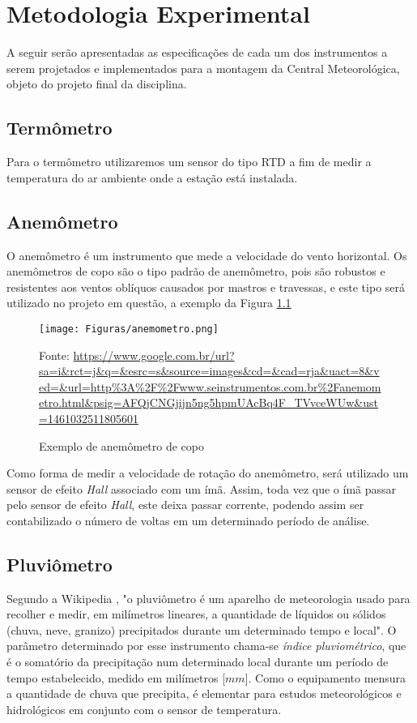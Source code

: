 \documentclass[12pt,a4paper]{instrumentacao}
\begin{document}
\chapter{Metodologia Experimental}
A seguir serão apresentadas as especificações de cada um dos instrumentos a serem projetados e implementados para a montagem da Central Meteorológica, objeto do projeto final da disciplina.

\section{Termômetro}
Para o termômetro utilizaremos um sensor do tipo RTD a fim de medir a temperatura do ar ambiente onde a estação está instalada.

\section{Anemômetro}
O anemômetro é um instrumento que mede a velocidade do vento horizontal. Os anemômetros de copo são o tipo padrão de anemômetro, pois são robustos e resistentes aos ventos oblíquos causados por mastros e travessas, e este tipo será utilizado no projeto em questão, a exemplo da Figura \ref{fig:anemometro}

\begin{figure}[h]
	\centering
		\texttt{[image: Figuras/anemometro.png]}
	\caption{Exemplo de anemômetro de copo}
	Fonte: \url{https://www.google.com.br/url?sa=i&rct=j&q=&esrc=s&source=images&cd=&cad=rja&uact=8&ved=&url=http\%3A\%2F\%2Fwww.seinstrumentos.com.br\%2Fanemometro.html&psig=AFQjCNGjijn5ng5hpmUAcBq4F_TVvceWUw&ust=1461032511805601}
	\label{fig:anemometro}
\end{figure}

Como forma de medir a velocidade de rotação do anemômetro, será utilizado um sensor de efeito \textit{Hall} associado com um ímã. Assim, toda vez que o ímã passar pelo sensor de efeito \textit{Hall}, este deixa passar corrente, podendo assim ser contabilizado o número de voltas em um determinado período de análise.


\section{Pluviômetro}
Segundo a Wikipedia \cite{pluviometro}, "o pluviômetro é um aparelho de meteorologia usado para recolher e medir, em milímetros lineares, a quantidade de líquidos ou sólidos (chuva, neve, granizo) precipitados durante um determinado tempo e local". O parâmetro determinado por esse instrumento chama-se \textit{índice pluviométrico}, que é o somatório da precipitação num determinado local durante um período de tempo estabelecido, medido em milímetros [$mm$]. Como o equipamento mensura a quantidade de chuva que precipita, é elementar para estudos meteorológicos e hidrológicos em conjunto com o sensor de temperatura.
\end{document}
